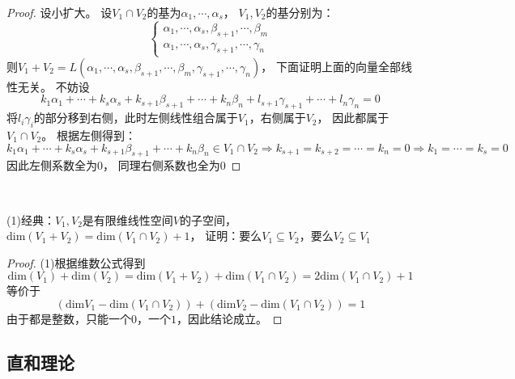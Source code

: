 \begin{proof}
  设小扩大。
  设$V_1 \cap V_2$的基为$\alpha_1,\cdots,\alpha_s$，
  $V_1,V_2$的基分别为：
  \begin{equation*}
    \begin{cases}
      \alpha_1,\cdots,\alpha_s,\beta_{s+1},\cdots,\beta_m\\
      \alpha_1,\cdots,\alpha_s,\gamma_{s+1},\cdots,\gamma_n
    \end{cases}
  \end{equation*}
  则$V_1+V_2 = L(\alpha_1,\cdots,\alpha_s,\beta_{s+1},\cdots,\beta_m,\gamma_{s+1},\cdots,\gamma_n)$，
  下面证明上面的向量全部线性无关。
  不妨设
  \begin{equation*}
    k_1\alpha_1+\cdots+k_s\alpha_s + k_{s+1}\beta_{s+1}+\cdots+k_n\beta_n + l_{s+1}\gamma_{s+1}+\cdots+l_n\gamma_n = 0
  \end{equation*}
  将$l_i\gamma_i$的部分移到右侧，此时左侧线性组合属于$V_1$，右侧属于$V_2$，
  因此都属于$V_1 \cap V_2$。
  根据左侧得到：
  \begin{equation*}
    k_1\alpha_1 + \cdots +k_s \alpha_s + k_{s+1}\beta_{s+1} + \cdots +  k_n\beta_n \in V_1 \cap V_2 \Rightarrow k_{s+1} = k_{s+2} = \cdots = k_n = 0 \Rightarrow k_1 = \cdots = k_s = 0
  \end{equation*}
  因此左侧系数全为$0$，
  同理右侧系数也全为$0$
\end{proof}

~

\begin{exercise}[维数公式相关]
  (1)经典：$V_1,V_2$是有限维线性空间$V$的子空间，
  $\mathrm{dim}(V_1 + V_2) = \mathrm{dim}(V_1 \cap V_2) + 1$，
  证明：要么$V_1 \subseteq V_2$，要么$V_2 \subseteq V_1$
\end{exercise}

\begin{proof}
  (1)根据维数公式得到
  \begin{equation*}
    \mathrm{dim}(V_1) + \mathrm{dim}(V_2) = \mathrm{dim}(V_1 + V_2) + \mathrm{dim}(V_1 \cap V_2) = 2 \mathrm{dim}(V_1 \cap V_2) + 1
  \end{equation*}
  等价于
  \begin{equation*}
    \left( \mathrm{dim}V_1 - \mathrm{dim}(V_1 \cap V_2) \right) + \left( \mathrm{dim}V_2 - \mathrm{dim}(V_1 \cap V_2) \right) = 1
  \end{equation*}
  由于都是整数，只能一个$0$，一个$1$，因此结论成立。
\end{proof}

\subsection{直和理论}

